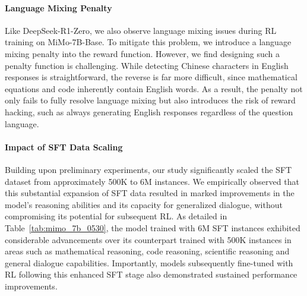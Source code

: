 \documentclass[11pt, a4paper, logo, copyright, nonumbering]{xiaomi}
\newcommand{\mimobase}{MiMo-7B-Base}
\begin{document}
\paragraph{Language Mixing Penalty}
Like DeepSeek-R1-Zero, we also observe language mixing issues during RL training on \mimobase{}.
To mitigate this problem, we introduce a language mixing penalty into the reward function.
However, we find designing such a penalty function is challenging.
While detecting Chinese characters in English responses is straightforward, the reverse is far more difficult, since mathematical equations and code inherently contain English words.
As a result, the penalty not only fails to fully resolve language mixing but also introduces the risk of reward hacking, such as always generating English responses regardless of the question language.


\paragraph{Impact of SFT Data Scaling}
Building upon preliminary experiments, our study significantly scaled the SFT dataset from approximately 500K to 6M instances. We empirically observed that this substantial expansion of SFT data resulted in marked improvements in the model's reasoning abilities and its capacity for generalized dialogue, without compromising its potential for subsequent RL. As detailed in Table~\ref{tab:mimo_7b_0530}, the model trained with 6M SFT instances exhibited considerable advancements over its counterpart trained with 500K instances in areas such as mathematical reasoning, code reasoning, scientific reasoning and general dialogue capabilities. Importantly, models subsequently fine-tuned with RL following this enhanced SFT stage also demonstrated sustained performance improvements.
\end{document}
